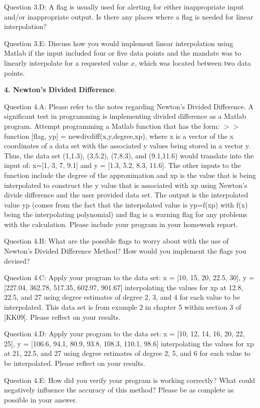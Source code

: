 \documentclass{article}
\renewcommand{\cite}[1]{[#1]}
\begin{document}
\medskip \par \noindent
%
Question 3.D:  A flag is usually used for alerting for either inappropriate input and/or inappropriate output. Is there any places where a flag is needed for linear interpolation?
\medskip \par \noindent
%
Question 3.E:  Discuss how you would implement linear interpolation using Matlab if the input included four or five data points and the mandate was to linearly interpolate for a requested value $x$, which was located between two data points. 
\medskip \par \noindent
%
{\bf 4. Newton's Divided Difference}. \medskip \par
Question 4.A: Please refer to the notes regarding Newton's Divided Difference. A significant test in programming is implementing divided difference as a Matlab program. Attempt programming a Matlab function that has the form: $>>$function [flag, yp] = newdivdiff(x,y,degree,xp), where x is a vector of the x coordinates of a data set with the associated y values being stored in a vector y. Thus, the data set (1,1.3), (3,5.2), (7,8.3), and (9.1,11.6) would translate into the input of: x=[1, 3, 7, 9.1] and y = [1.3, 5.2, 8.3, 11.6]. The other inputs to the function include the degree of the approximation and xp is the value that is being interpolated to construct the y value that is associated with xp using Newton's divide difference and the user provided data set. The output is the interpolated value yp (comes from the fact that the interpolated value is yp=f(xp) with f(x) being the interpolating polynomial) and flag is a warning flag for any problems with the calculation. Please include your program in your homework report. 
\medskip \par \noindent
Question 4.B: What are the possible flags to worry about with the use of Newton's Divided Difference Method? How would you implement the flags you devised?
\medskip \par \noindent
Question 4.C: Apply your program to the data set: x = [10, 15, 20, 22.5, 30], y = [227.04, 362.78, 517.35, 602.97, 901.67] interpolating the values for xp at 12.8, 22.5, and 27 using degree estimates of degree 2, 3, and 4 for each value to be interpolated. This data set is from example 2 in chapter 5 within section 3 of \cite{KK09}. Please reflect on your results. 
\medskip \par \noindent
Question 4.D: Apply your program
to the data set: x = [10, 12, 14, 16, 20, 22, 25], y = [106.6, 94.1, 80.9, 93.8, 108.3, 110.1, 98.6] interpolating the values for xp at 21, 22.5, and 27 using degree estimates of degree 2, 5, and 6 for each value to be interpolated. Please reflect on your results. 
\medskip \par \noindent
Question 4.E: How did you verify your program is working correctly? What could negatively influence the accuracy of this method?  Please be as complete as possible in your answer. 
\par \bigskip \par
\end{document}
